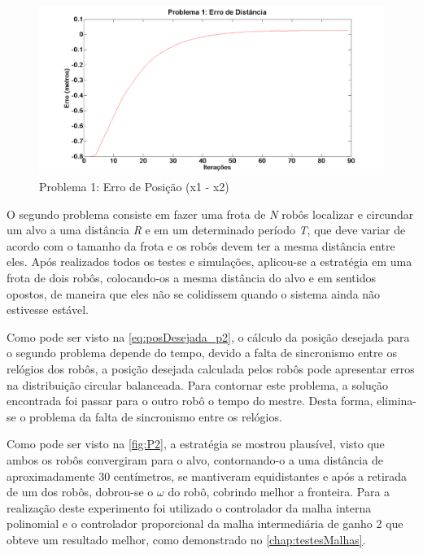 \begin{figure}[!htb]
	\centering
	\includegraphics[width=.9\linewidth]{./Testes/Problema1/Incremental/ErroDistancia}
	\caption{Problema 1: Erro de Posição (x1 - x2)}
	\label{fig:P12Erro}
\end{figure}

O segundo problema consiste em fazer uma frota de \emph{N} robôs localizar e circundar um alvo a uma distância \emph{R} e em um determinado período \emph{T}, que deve variar de acordo com o tamanho da frota e os robôs devem ter a mesma distância entre eles. Após realizados todos os testes e simulações, aplicou-se a estratégia em uma frota de dois robôs, colocando-os a mesma distância do alvo e em sentidos opostos, de maneira que eles não se colidissem quando o sistema ainda não estivesse estável. 

Como pode ser visto na \autoref{eq:posDesejada_p2}, o cálculo da posição desejada para o segundo problema depende do tempo, devido a falta de sincronismo entre os relógios dos robôs, a posição desejada calculada pelos robôs pode apresentar erros na distribuição circular balanceada. Para contornar este problema, a solução encontrada foi passar para o outro robô o tempo do mestre. Desta forma, elimina-se o problema da falta de sincronismo entre os relógios. 

Como pode ser visto na \autoref{fig:P2}, a estratégia se mostrou plausível, visto que ambos os robôs convergiram para o alvo, contornando-o a uma distância de aproximadamente 30 centímetros, se mantiveram equidistantes e após a retirada de um dos robôs, %
dobrou-se o $\omega$ do robô, cobrindo melhor a fronteira. Para a realização deste experimento foi utilizado o controlador da malha interna polinomial e o controlador proporcional da malha intermediária de ganho 2 que obteve um resultado melhor, como demonstrado no \autoref{chap:testesMalhas}.

